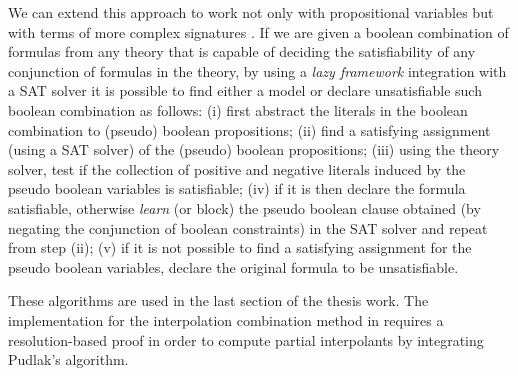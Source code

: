 


We can extend this approach to work not only with propositional
variables but with terms of more complex signatures 
\cite{10.5555/1391237}. If we are given a boolean combination 
of formulas from any theory that is capable of deciding the 
satisfiability of any conjunction of formulas in the theory, 
by using a \emph{lazy framework} integration with a SAT solver it is 
possible to find either a model or declare unsatisfiable such boolean
combination as follows: (i) first abstract the literals in the boolean
combination to (pseudo) boolean propositions; (ii) find a satisfying
assignment (using a SAT solver) of the (pseudo) boolean propositions;
(iii) using the theory solver, test if the collection of positive
and negative literals induced by the pseudo boolean variables is
satisfiable; (iv) if it is then declare the formula satisfiable, 
otherwise \emph{learn} (or block) the pseudo boolean clause obtained
(by negating the conjunction of boolean constraints) in the SAT
solver and repeat from step (ii); (v) if it is not possible to
find a satisfying assignment for the pseudo boolean variables, 
declare the original formula to be unsatisfiable.

These algorithms are used in the last section of the thesis work.
The implementation for the interpolation combination method
in \cite{10.1007/11532231_26} requires a resolution-based
proof in order to compute partial interpolants by integrating
Pudlak's algorithm.

